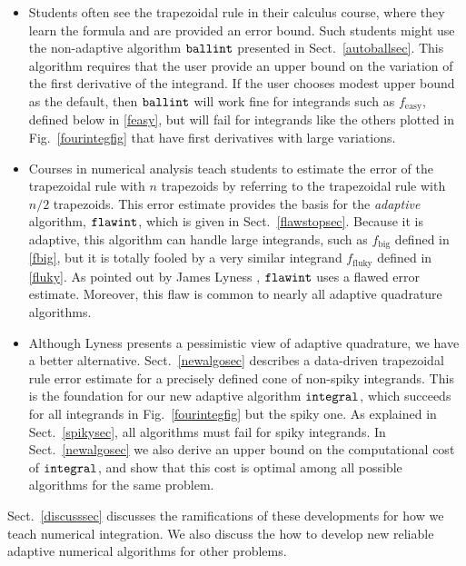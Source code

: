 \documentclass[]{article}
\DeclareMathOperator{\integ}{\texttt{\textup{integral}}}
\DeclareMathOperator{\flawinteg}{\texttt{\textup{flawint}}}
\DeclareMathOperator{\ballinteg}{\texttt{\textup{ballint}}}
\theoremstyle{definition}
\theoremstyle{remark}
\begin{document}
\begin{itemize}
\item Students often see the trapezoidal rule in their calculus course, where they learn the formula and are provided an error bound.  Such students might use the non-adaptive algorithm $\ballinteg$ presented in Sect.\ \ref{autoballsec}.  This algorithm requires that the user provide an upper bound on the variation of the first derivative of the integrand.  If the user chooses modest upper bound as the default, then $\ballinteg$ will work fine for integrands such as $f_{\text{easy}}$, defined below in \eqref{feasy}, but will fail for integrands like the others plotted in Fig.\ \ref{fourintegfig} that have first derivatives with large variations.

\item Courses in numerical analysis teach students to estimate the error of the trapezoidal rule with $n$ trapezoids by referring to the trapezoidal rule with $n/2$ trapezoids.  This error estimate provides the basis for the \emph{adaptive} algorithm, $\flawinteg$, which is given in Sect.\ \ref{flawstopsec}. Because it is adaptive, this algorithm can handle large integrands, such as $f_{\text{big}}$ defined in \eqref{fbig}, but it is totally fooled by a very similar integrand  $f_{\text{fluky}}$ defined in \eqref{fluky}.  As pointed out by James Lyness , $\flawinteg$ uses a flawed error estimate.  Moreover, this flaw is common to nearly all adaptive quadrature algorithms.

\item Although Lyness presents a pessimistic view of adaptive quadrature, we have a better alternative.  Sect.\ \ref{newalgosec} describes a data-driven trapezoidal rule error estimate for a precisely defined cone of non-spiky integrands. This is the foundation for our new adaptive algorithm $\integ$, which succeeds for all integrands in Fig.\ \ref{fourintegfig} but the spiky one.  As explained in Sect.\ \ref{spikysec}, all algorithms must fail for spiky integrands.  In Sect.\ \ref{newalgosec} we also derive an upper bound on the computational cost of $\integ$, and show that this cost is optimal among all possible algorithms for the same problem.  

\end{itemize}
Sect.\ \ref{discusssec}  discusses the ramifications of these developments for how we teach numerical integration.  We also discuss the how to develop new reliable adaptive numerical algorithms for other problems. 
\end{document}
